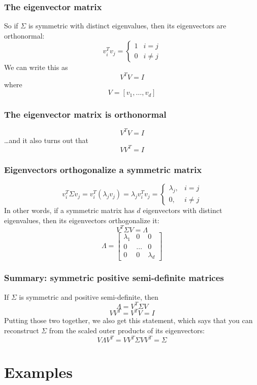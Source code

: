 \documentclass{beamer}
\begin{document}
\begin{frame}
  \frametitle{The eigenvector matrix}
  So if $\Sigma$ is symmetric with distinct eigenvalues, then
  its eigenvectors  are orthonormal:
  \[
  {v}_i^T{v}_j=
  \begin{cases}
    1&i=j\\
    0&i\ne j
  \end{cases}
  \]
  We can  write this as
  \[
  V^TV = I
  \]
  where
  \[
  V=\left[{v}_1,\ldots,{v}_{d}\right]
  \]
\end{frame}

\begin{frame}
  \frametitle{The eigenvector matrix is orthonormal}
  \[
  V^TV = I
  \]
  \ldots and it also turns out that
  \[
  VV^T = I
  \]
\end{frame}

\begin{frame}
  \frametitle{Eigenvectors orthogonalize a symmetric matrix}
  \[
  {v}_i^T\Sigma{v}_j=
  {v}_i^T(\lambda_j{v}_j)=\lambda_j{v}_i^T{v}_j
  =\begin{cases}\lambda_j,&i=j\\0,&i\ne j\end{cases}
  \]
  In other words, if a symmetric matrix has $d$ eigenvectors with
  distinct eigenvalues, then its eigenvectors orthogonalize it:
  \[
  V^T\Sigma V = \Lambda
  \]
  \[
  \Lambda=
  \left[\begin{array}{ccc}\lambda_1&0&0\\0&\ldots&0\\0&0&\lambda_{d}\end{array}\right]
  \]
\end{frame}

\begin{frame}
  \frametitle{Summary: symmetric positive semi-definite matrices}

  If $\Sigma$ is symmetric and positive semi-definite, then
  \[
  \Lambda = V^T\Sigma V
  \]
  \[
  VV^T=V^TV=I
  \]
  Putting those two together, we also get this statement, which says
  that you can reconstruct $\Sigma$ from the scaled outer products of
  its eigenvectors:
  \[
  V\Lambda V^T = VV^T\Sigma VV^T = \Sigma
  \]
\end{frame}

\section{Examples}
\setcounter{subsection}{1}
\end{document}
